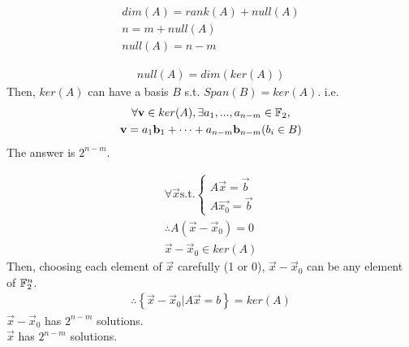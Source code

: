 \documentclass[1]{mathtoolkit}
\begin{document}
\maketitle

\begin{p}
  \item
    \begin{subp}
      \item
        \begin{gather}
          dim(A) = rank(A) + null(A) \\
          n = m + null(A) \\
          null(A) = n - m
        \end{gather}
      \item
        \begin{gather}
          null(A) = dim(ker(A))
        \end{gather}
        Then, $ker(A)$ can have a basis $B$ s.t. $Span(B) = ker(A)$.
        i.e.
        \begin{gather}
          \forall \mathbf{v} \in ker(A),
          \exists a_1, ..., a_{n-m} \in \mathbb{F}_2, \\
          \mathbf{v} = a_1 \mathbf{b}_1 + \dots + a_{n-m} \mathbf{b}_{n-m} (b_i \in B)
        \end{gather}
        \therefore The answer is $2^{n-m}$.
      \item
        \begin{gather}
          \forall \vec{x}
          \text{s.t.}
          \begin{cases}
            A \vec{x} = \vec{b} \\
            A \vec{x_0} = \vec{b}
          \end{cases} \\
          \therefore A (\vec{x} - \vec{x}_0) = 0 \\
          \vec{x} - \vec{x}_0 \in ker(A)
        \end{gather}
        Then, choosing each element of $\vec{x}$ carefully (1 or 0),
        $\vec{x} - \vec{x}_0$ can be any element of $\mathbb{F}^n_2$.
        \begin{gather}
          \therefore \left\{ \vec{x} - \vec{x}_0 | A \vec{x} = b \right\} = ker(A)
        \end{gather}
        \therefore $\vec{x} - \vec{x}_0$ has $2^{n-m}$ solutions. \\
        \therefore $\vec{x}$ has $2^{n-m}$ solutions. \\
    \end{subp}


\end{p}
\end{document}
